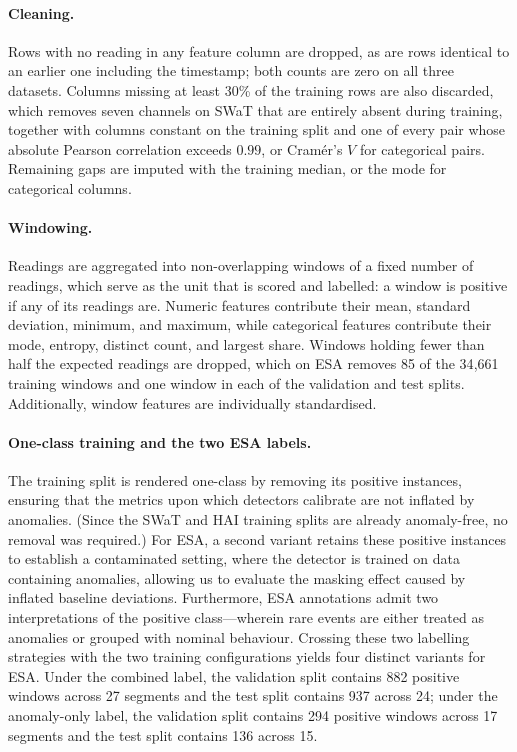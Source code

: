 \documentclass{article}
\begin{document}
\paragraph{Cleaning.} Rows with no reading in any feature column are dropped, as are rows
identical to an earlier one including the timestamp; both counts are zero on all three
datasets. Columns missing at least 30\% of the training rows are also discarded, which removes
seven channels on SWaT that are entirely absent during training, together with columns
constant on the training split and one of every pair whose absolute Pearson correlation
exceeds $0.99$, or Cram\'er's $V$ for categorical pairs. Remaining gaps are imputed with
the training median, or the mode for categorical columns.

\paragraph{Windowing.} Readings are aggregated into non-overlapping windows of a fixed
number of readings, which serve as the unit that is scored and labelled: a window is positive
if any of its readings are. Numeric features contribute their mean, standard deviation,
minimum, and maximum, while categorical features contribute their mode, entropy, distinct count, and
largest share. Windows holding fewer
than half the expected readings are dropped, which on ESA removes 85 of the 34{,}661
training windows and one window in each of the validation and test splits.
Additionally, window features are individually standardised.

\paragraph{One-class training and the two ESA labels.} The training split is rendered
one-class by removing its positive instances, ensuring that the metrics upon which detectors
calibrate are not inflated by anomalies. (Since the SWaT and HAI training splits are
already anomaly-free, no removal was required.) 
For ESA, a second variant retains these positive instances to establish a contaminated setting, 
where the detector is trained on data containing anomalies, allowing us to evaluate the masking effect caused by inflated baseline deviations. 
Furthermore, ESA annotations admit two interpretations of the positive class---wherein rare events are either treated as anomalies or grouped with nominal behaviour. 
Crossing these two labelling strategies with the two training configurations yields four distinct variants for ESA. 
Under the combined label, the validation split contains 882 positive windows across 27 segments and the test split contains 937 across 24; 
under the anomaly-only label, the validation split contains 294 positive windows across 17 segments and the test split contains 136 across 15.
\end{document}
